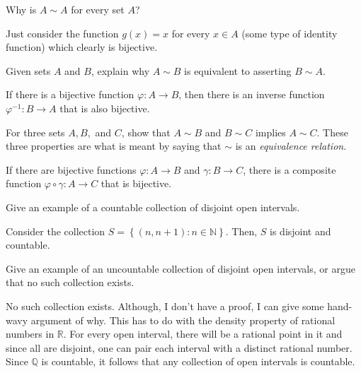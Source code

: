\documentclass[12pt]{article}
\newcommand{\N}{\mathbb{N}}
\newcommand{\R}{\mathbb{R}}
\newcommand{\Q}{\mathbb{Q}}
\newenvironment{problem}[2][Problem]{\begin{trivlist}
		\item[\hskip \labelsep {\bfseries #1}\hskip \labelsep {\bfseries #2.}]}{\end{trivlist}}
\newenvironment{solution}[2][Solution]{\begin{trivlist}
		\item[\hskip \labelsep {\bfseries #1}\hskip \labelsep {\bfseries #2.}]}{\end{trivlist}}
\begin{document}
\begin{problem}{1.5.5}
  \begin{enumerate}[label=(\alph*)]
    \item Why is $A\sim A$ for every set $A$?
      \begin{solution}{(a)}
	Just consider the function $g(x)=x$ for every $x\in A$ (some type of identity function) which clearly is bijective. 
      \end{solution}
   \item Given sets $A$ and $B$, explain why $A\sim B$ is equivalent to asserting $B\sim A$.
     \begin{solution}{(b)}
       If there is a bijective function $\varphi: A\to B$, then there is an inverse function $\varphi^{-1}: B\to A$ that is also bijective.
     \end{solution}
   \item For three sets $A,B,$ and $C$, show that $A\sim B$ and $B\sim C$ implies $A\sim C$. These three properties are what is meant by saying that $\sim$ is an \textit{equivalence relation}.
     \begin{solution}{(c)}
       If there are bijective functions $\varphi: A\to B$ and $\gamma: B\to C$, there is a composite function $\varphi \circ \gamma:A\to C$ that is bijective.
     \end{solution}
  \end{enumerate}
\end{problem}

\begin{problem}{1.5.6}
  \begin{enumerate}[label=(\alph*)]
    \item Give an example of a countable collection of disjoint open intervals.
      \begin{solution}{(a)}
	Consider the collection $S=\left\{(n,n+1):n\in\N \right\}$. Then, $S$ is disjoint and countable.
	\end{solution}
    \item Give an example of an uncountable collection of disjoint open intervals, or argue that no such collection exists.
      \begin{solution}{(b)}
	No such collection exists. Although, I don't have a proof, I can give some hand-wavy argument of why. This has to do with the density property of rational numbers in $\R$. For every open interval, there will be a rational point in it and since all are disjoint, one can pair each interval with a distinct rational number. Since $\Q$ is countable, it follows that any collection of open intervals is countable.
      \end{solution}
  \end{enumerate}
\end{problem}
\end{document}

